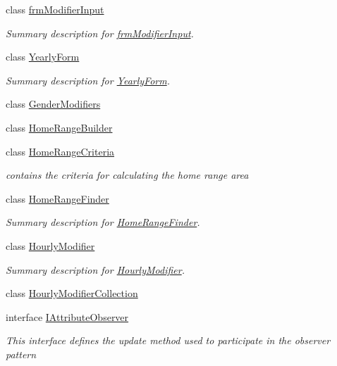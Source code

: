 \begin{DoxyCompactItemize}
class \hyperlink{class_s_e_a_r_c_h_1_1frm_modifier_input}{frm\-Modifier\-Input}
\begin{DoxyCompactList}\small\item\em Summary description for \hyperlink{class_s_e_a_r_c_h_1_1frm_modifier_input}{frm\-Modifier\-Input}. \end{DoxyCompactList}\item 
class \hyperlink{class_s_e_a_r_c_h_1_1_yearly_form}{Yearly\-Form}
\begin{DoxyCompactList}\small\item\em Summary description for \hyperlink{class_s_e_a_r_c_h_1_1_yearly_form}{Yearly\-Form}. \end{DoxyCompactList}\item 
class \hyperlink{class_s_e_a_r_c_h_1_1_gender_modifiers}{Gender\-Modifiers}
\item 
class \hyperlink{class_s_e_a_r_c_h_1_1_home_range_builder}{Home\-Range\-Builder}
\item 
class \hyperlink{class_s_e_a_r_c_h_1_1_home_range_criteria}{Home\-Range\-Criteria}
\begin{DoxyCompactList}\small\item\em contains the criteria for calculating the home range area \end{DoxyCompactList}\item 
class \hyperlink{class_s_e_a_r_c_h_1_1_home_range_finder}{Home\-Range\-Finder}
\begin{DoxyCompactList}\small\item\em Summary description for \hyperlink{class_s_e_a_r_c_h_1_1_home_range_finder}{Home\-Range\-Finder}. \end{DoxyCompactList}\item 
class \hyperlink{class_s_e_a_r_c_h_1_1_hourly_modifier}{Hourly\-Modifier}
\begin{DoxyCompactList}\small\item\em Summary description for \hyperlink{class_s_e_a_r_c_h_1_1_hourly_modifier}{Hourly\-Modifier}. \end{DoxyCompactList}\item 
class \hyperlink{class_s_e_a_r_c_h_1_1_hourly_modifier_collection}{Hourly\-Modifier\-Collection}
\item 
interface \hyperlink{interface_s_e_a_r_c_h_1_1_i_attribute_observer}{I\-Attribute\-Observer}
\begin{DoxyCompactList}\small\item\em This interface defines the update method used to participate in the observer pattern \end{DoxyCompactList}\item 

\end{DoxyCompactItemize}
